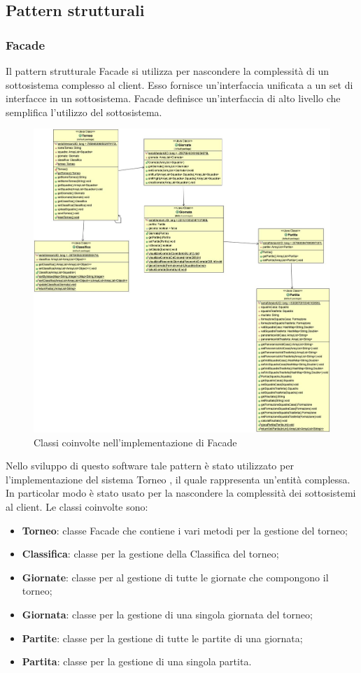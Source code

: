 \documentclass[12pt,a4paper]{article}
\begin{document}
\subsection{Pattern strutturali}
\subsubsection{Facade}
Il pattern strutturale Facade si utilizza per nascondere la complessità di un sottosistema complesso al client. Esso fornisce un'interfaccia unificata a un set di interfacce in un sottosistema. Facade definisce un'interfaccia di alto livello che semplifica l'utilizzo del sottosistema.
\begin{figure}[h]
\centering
\includegraphics[width=16 cm ,keepaspectratio]{Facade.jpg}
\caption{Classi coinvolte nell'implementazione di Facade}
\end{figure}
\newline
Nello sviluppo di questo software tale pattern è stato utilizzato per l'implementazione del sistema Torneo , il quale rappresenta un'entità complessa. In particolar modo è stato usato per la nascondere la complessità dei sottosistemi al client. Le classi coinvolte sono:
\begin{itemize}
\item \textbf{Torneo}: classe Facade che contiene i vari metodi per la gestione del torneo;
\item \textbf{Classifica}: classe per la gestione della Classifica del torneo;
\item \textbf{Giornate}: classe per al gestione di tutte le giornate che compongono il torneo;
\item \textbf{Giornata}: classe per la gestione di una singola giornata del torneo;
\item \textbf{Partite}: classe per la gestione di tutte le partite di una giornata;
\item \textbf{Partita}: classe per la gestione di una singola partita.
\end{itemize}
\end{document}
